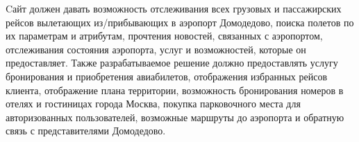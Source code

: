 Cайт должен давать возможность отслеживания 
всех грузовых и пассажирских рейсов вылетающих из/прибывающих в 
аэропорт Домодедово, поиска полетов по их 
параметрам и атрибутам, прочтения новостей, 
связанных с аэропортом, отслеживания состояния 
аэропорта, услуг и возможностей, которые он предоставляет. 
Также разрабатываемое решение должно предоставлять 
услугу бронирования и приобретения авиабилетов, 
отображения избранных рейсов клиента, отображение плана территории, 
возможность бронирования номеров в отелях и гостиницах города Москва, 
покупка парковочного места для авторизованных пользователей,
возможные маршруты до аэропорта и обратную 
связь с представителями Домодедово. 